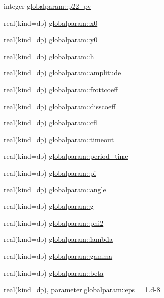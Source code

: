 \begin{DoxyCompactItemize}
integer \mbox{\hyperlink{namespaceglobalparam_a1c0b88f532e0bb8c21c4aa92a92405ca}{globalparam\+::p22\+\_\+pv}}
\item 
real(kind=dp) \mbox{\hyperlink{namespaceglobalparam_a9e5d836cf78ed835befb0354a98e7e17}{globalparam\+::x0}}
\item 
real(kind=dp) \mbox{\hyperlink{namespaceglobalparam_a6192d97c147b8b0f5ebda79933dd6f16}{globalparam\+::y0}}
\item 
real(kind=dp) \mbox{\hyperlink{namespaceglobalparam_afa512f0663f1649ec948dd8629ded9c2}{globalparam\+::h\+\_}}
\item 
real(kind=dp) \mbox{\hyperlink{namespaceglobalparam_ad4de2aae56528f5e68832e367c812b7e}{globalparam\+::amplitude}}
\item 
real(kind=dp) \mbox{\hyperlink{namespaceglobalparam_a3d60c54a7f29c018175090d8f352e532}{globalparam\+::frottcoeff}}
\item 
real(kind=dp) \mbox{\hyperlink{namespaceglobalparam_a2b80e7d2d9fedcf41afb3a695951758b}{globalparam\+::disscoeff}}
\item 
real(kind=dp) \mbox{\hyperlink{namespaceglobalparam_adfd0d04d365d8eea624298b512502b3a}{globalparam\+::cfl}}
\item 
real(kind=dp) \mbox{\hyperlink{namespaceglobalparam_a10139a2787968ad3cf07f503ad8dd164}{globalparam\+::timeout}}
\item 
real(kind=dp) \mbox{\hyperlink{namespaceglobalparam_aedbaf94b837b9fa76dfe9fb6d99b21b4}{globalparam\+::period\+\_\+time}}
\item 
real(kind=dp) \mbox{\hyperlink{namespaceglobalparam_af8b4334cb676810d60c0e1a746531412}{globalparam\+::pi}}
\item 
real(kind=dp) \mbox{\hyperlink{namespaceglobalparam_afc46f9587744d04e67298c60303cd5f0}{globalparam\+::angle}}
\item 
real(kind=dp) \mbox{\hyperlink{namespaceglobalparam_a5ea70464e51d2dc580f4c6c8b451cb01}{globalparam\+::g}}
\item 
real(kind=dp) \mbox{\hyperlink{namespaceglobalparam_a7e2e3cc9c0b15b0250b31dd03fb704c6}{globalparam\+::phi2}}
\item 
real(kind=dp) \mbox{\hyperlink{namespaceglobalparam_afcf85dea7c5d650ef77d480eb6d2a614}{globalparam\+::lambda}}
\item 
real(kind=dp) \mbox{\hyperlink{namespaceglobalparam_a22c2013f9cb1fb03d79e99fc038d55d1}{globalparam\+::gamma}}
\item 
real(kind=dp) \mbox{\hyperlink{namespaceglobalparam_a71ed33aead9f8bd6716557281b189e3c}{globalparam\+::beta}}
\item 
real(kind=dp), parameter \mbox{\hyperlink{namespaceglobalparam_a50294033ac3a178743643d3203a2d364}{globalparam\+::eps}} = 1.d-\/8
\end{DoxyCompactItemize}



